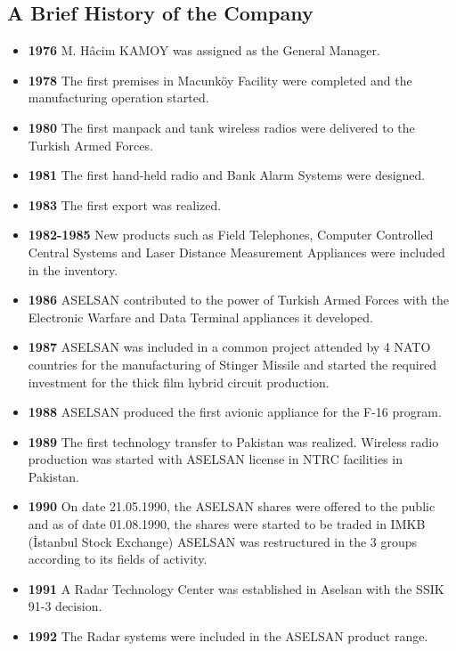 \subsection{A Brief History of the Company}
\begin{itemize}
\item \textbf{1976} 
\subitem M. Hâcim KAMOY was assigned as the General Manager.
\item \textbf{ 1978 } 
\subitem The first premises in Macunköy Facility were completed and the manufacturing operation started.
\item \textbf{ 1980 }
\subitem The first manpack and tank wireless radios were delivered to the Turkish Armed Forces.
\item \textbf{ 1981 }
\subitem The first hand-held radio and Bank Alarm Systems were designed. 
\item \textbf{ 1983 } 
\subitem The first export was realized. 
\item \textbf{ 1982-1985 }
\subitem New products such as Field Telephones, Computer Controlled Central Systems and Laser Distance Measurement Appliances were included in the inventory. 
\item \textbf{ 1986  }
\subitem ASELSAN contributed to the power of Turkish Armed Forces with the Electronic Warfare and Data Terminal appliances it developed. 
\item \textbf{  1987 }
\subitem ASELSAN was included in a common project attended by 4 NATO countries for the manufacturing of Stinger Missile and started the required investment for the thick film hybrid circuit production. 
\item \textbf{  1988 }
\subitem ASELSAN produced the first avionic appliance for the F-16 program.
\item \textbf{ 1989 }
\subitem The first technology transfer to Pakistan was realized. Wireless radio production was started with ASELSAN license in NTRC facilities in Pakistan. 
\item \textbf{  1990 }
\subitem On date 21.05.1990, the ASELSAN shares were offered to the public and as of date 01.08.1990, the shares were started to be traded in IMKB (İstanbul Stock Exchange)
\subitem ASELSAN was restructured in the 3 groups according to its fields of activity.
\item \textbf{ 1991 }
\subitem A Radar Technology Center was established in Aselsan with the SSIK 91-3 decision.
\item \textbf{ 1992 }
\subitem The Radar systems were included in the ASELSAN product range.

\end{itemize}
